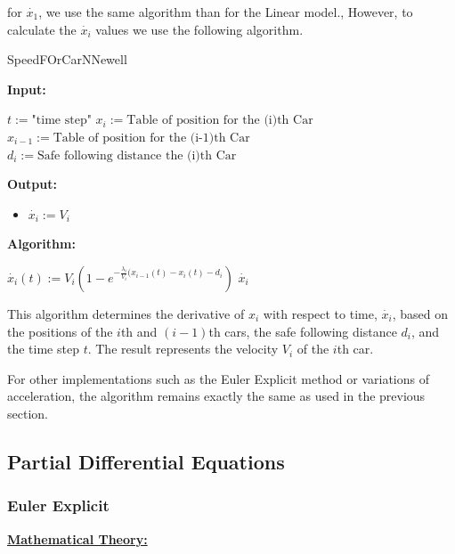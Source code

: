 \documentclass{article}
\begin{document}
		for $\dot{x_1}$, we use the same algorithm than for the Linear model., However, to calculate the $\dot{x_i}$ values we use the following algorithm.
		
		\begin{algorithm}[H]
			\caption{SpeedFOrCarNNewell}\label{alg:xi_dot}
			\begin{algorithmic}
				\State \textbf{Input:} \\
				\begin{itemize}
					\State $t:=\text{"time  step"}$
					\State$x_i:=\text{Table of position for the (i)th Car}$
					\State$x_{i-1}:=\text{Table of position for the (i-1)th Car}$
					\State$d_{i}:=\text{Safe following distance the (i)th Car}$
				\end{itemize}
				\State \textbf{Output:} \\
				\begin{itemize}[]
					\item $\dot{x_i}:=V_i$
				\end{itemize}
				\State \textbf{Algorithm:} \\
				\begin{itemize}[]
					\State $\dot{x_i}(t):=V_i(1-e^{-\frac{\lambda_i}{V_i}(x_{i-1}(t) - x_i(t) - d_i})$ 
					\State \Return $\dot{x_i}$ 
				\end{itemize}		
			\end{algorithmic}
		\end{algorithm}
		This algorithm determines the derivative of $x_i$ with respect to time, $\dot{x_i}$, based on the positions of the $i$th and $(i-1)$th cars, the safe following distance $d_i$, and the time step $t$. The result represents the velocity $V_i$ of the $i$th car. \newline\newline
		
		For other implementations such as the Euler Explicit method or variations of acceleration, the algorithm remains exactly the same as used in the previous section.
		\subsection{Partial Differential Equations}
		
		\subsubsection{Euler Explicit}
		
		\textbf{\underline{Mathematical Theory:}} \newline\newline
		
\end{document}
